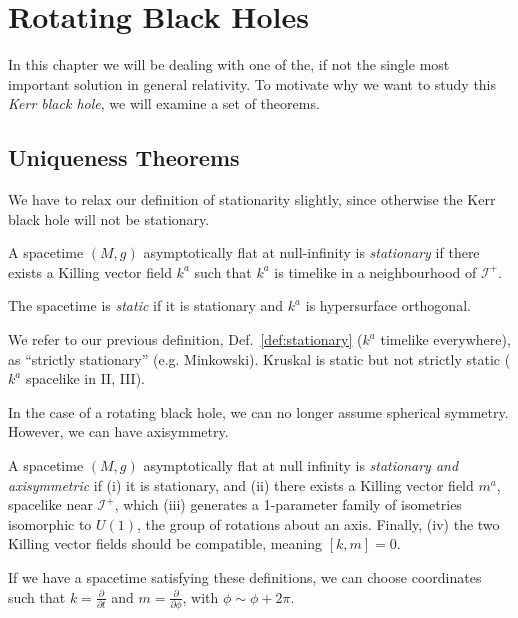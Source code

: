 
\chapter{Rotating Black Holes}%
\label{cha:rotating_black_holes}

In this chapter we will be dealing with one of the, if not the single most important solution in general relativity.
To motivate why we want to study this \emph{Kerr black hole}, we will examine a set of theorems.

\section{Uniqueness Theorems}%
\label{sec:uniqueness_theorems}

We have to relax our definition of stationarity slightly, since otherwise the Kerr black hole will not be stationary.
\begin{definition}[stationary]
  A spacetime $(M, g)$ asymptotically flat at null-infinity is \emph{stationary} if there exists a Killing vector field $k^{a}$ such that $k^{a}$ is timelike in a neighbourhood of $\mathscr{I}^+$.
\end{definition}
\begin{definition}[static]
  The spacetime is \emph{static} if it is stationary and $k^{a}$ is hypersurface orthogonal.
\end{definition}

We refer to our previous definition, Def.~\ref{def:stationary} ($k^{a}$ timelike everywhere), as ``strictly stationary'' (e.g. Minkowski).
Kruskal is static but not strictly static ($k^{a}$ spacelike in II, III).

In the case of a rotating black hole, we can no longer assume spherical symmetry. However, we can have axisymmetry.
\begin{definition}
  A spacetime $(M, g)$ asymptotically flat at null infinity is \emph{stationary and axisymmetric} if (i) it is stationary, and (ii) there exists a Killing vector field $m^{a}$, spacelike near $\mathscr{I}^+$, which (iii) generates a 1-parameter family of isometries isomorphic to $U(1)$, the group of rotations about an axis.
  Finally, (iv) the two Killing vector fields should be compatible, meaning $[k, m] = 0$.
\end{definition}

If we have a spacetime satisfying these definitions, we can choose coordinates such that $k = \frac{\partial}{\partial t}$ and $m = \frac{\partial }{\partial \phi}$, with $\phi \sim \phi + 2 \pi$.

